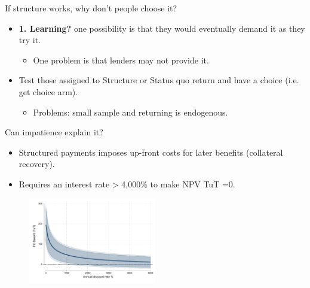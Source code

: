 \documentclass[9pt, aspectratio=169]{beamer}
\begin{document}
\begin{frame}{If structure works, why don't people choose it?}
\begin{itemize}
    \item \textbf{1. Learning?} one possibility is that they would eventually demand it as they try it.
    \begin{itemize}
        \item One problem is that lenders may not provide it.
    \end{itemize}
    \vfill \item  Test those assigned to Structure or Status quo return and have a choice (i.e. get choice arm).
        \begin{itemize}
        \item Problems: small sample and returning is endogenous.
    \end{itemize}
 \end{itemize}  
 \vspace{.1in}
\begin{table}[H]
\begin{center}
 \resizebox{0.65\textwidth}{!}{
\small{}
}
\end{center}
\end{table}
\end{frame}





\begin{frame}{Can impatience explain it?}
    \begin{itemize}
    \item  Structured payments imposes up-front costs for later benefits (collateral recovery).  
    \item  Requires an interest rate > 4,000\% to make NPV TuT =0. 
    \end{itemize}
\vspace{.1in}
\begin{figure}[H]
    \begin{center}
        \centering
        \includegraphics[width=0.50\textwidth]{Figuras/discount_effect_tut.pdf}
    \end{center}
\end{figure}   
\end{frame}
\end{document}
